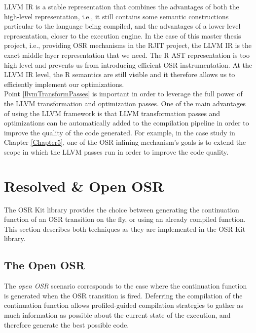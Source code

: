 LLVM IR is a stable representation that combines the advantages of both the high-level representation, i.e., it still contains some semantic constructions particular to the language being compiled, and the advantages of a lower level representation, closer to the execution engine.
In the case of this master thesis project, i.e., providing OSR mechanisms in the RJIT project, the LLVM IR is the exact middle layer representation that we need. 
The R AST representation is too high level and prevents us from introducing efficient OSR instrumentation. 
At the LLVM IR level, the R semantics are still visible and it therefore allows us to efficiently implement our optimizations.\\

Point \ref{llvmTransformPasses} is important in order to leverage the full power of the LLVM transformation and optimization passes.
One of the main advantages of using the LLVM framework is that LLVM transformation passes and optimizations can be automatically added to the compilation pipeline in order to improve the quality of the code generated.
For example, in the case study in Chapter \ref{Chapter5}, one of the OSR inlining mechanism's goals is to extend the scope in which the LLVM passes run in order to improve the code quality.\\


\section{Resolved \& Open OSR}
The OSR Kit library\cite{OSRKit} provides the choice between generating the continuation function of an OSR transition on the fly, or using an already compiled function.
This section describes both techniques as they are implemented in the OSR Kit library.\\
 
\subsection{The Open OSR}


The \textit{open OSR} scenario corresponds to the case where the continuation function is generated when the OSR transition is fired.
Deferring the compilation of the continuation function allows profiled-guided compilation strategies to gather as much information as possible about the current state of the execution, and therefore generate the best possible code.\\

